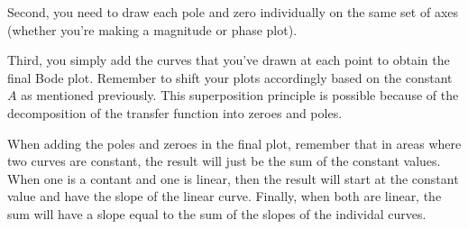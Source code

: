 \documentclass{article}
\begin{document}
Second, you need to draw each pole and zero individually on the same set of axes (whether you're making a magnitude or phase plot).

Third, you simply add the curves that you've drawn at each point to obtain the final Bode plot. Remember to shift your plots accordingly based on the constant $A$ as mentioned previously. This superposition principle is possible because of the decomposition of the transfer function into zeroes and poles.

When adding the poles and zeroes in the final plot, remember that in areas where two curves are constant, the result will just be the sum of the constant values. When one is a contant and one is linear, then the result will start at the constant value and have the slope of the linear curve. Finally, when both are linear, the sum will have a slope equal to the sum of the slopes of the individal curves.
\end{document}
